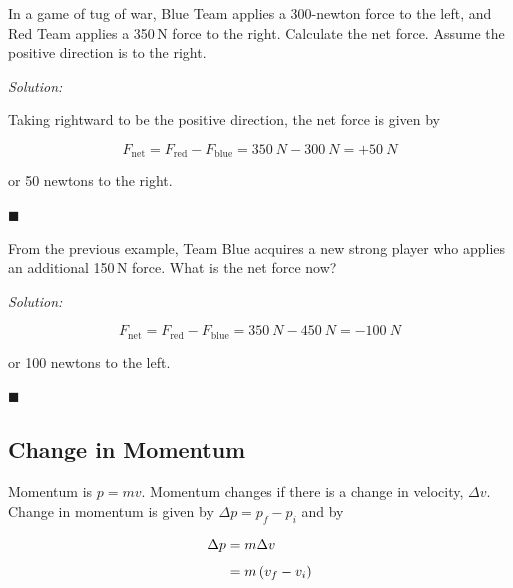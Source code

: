 \documentclass[dvipsnames]{article}
\begin{document}
\begin{example}
In a game of tug of war, Blue Team applies a 300-newton force to the left, and Red Team applies a 350\,N force to the right. Calculate the net force. Assume the positive direction is to the right.
\end{example}

\textit{Solution:} 

Taking rightward to be the positive direction, the net force is given by

\begin{equation*}
    F_\mathrm{net} = F_\mathrm{red} - F_\mathrm{blue} = \SI{350}{N} - \SI{300}{N} = \boxed{+\SI{50}{N}}
\end{equation*}

or 50 newtons to the right.

\hfill $\blacksquare$


\begin{example}
From the previous example, Team Blue acquires a new strong player who applies an additional 150\,N force. What is the net force now?
\end{example}

\textit{Solution:}

\begin{equation*}
    F_\mathrm{net} = F_\mathrm{red} - F_\mathrm{blue} = \SI{350}{N} - \SI{450}{N} = \boxed{-\SI{100}{N}}
\end{equation*}

or 100 newtons to the left.

\hfill $\blacksquare$

\subsection{Change in Momentum}

Momentum is $p = mv$. Momentum changes if there is a change in velocity, $\Delta v$. Change in momentum is given by $\Delta p = p_f - p_i$ and by

\begin{align}
    \Delta p &= m \Delta v \label{TuKpz} \\[1ex]
    &= m \left(v_f - v_i\right) \notag
\end{align}
\end{document}
